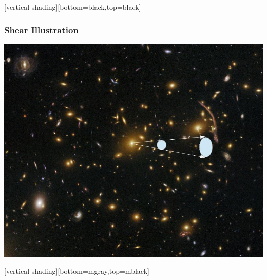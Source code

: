 \documentclass{beamer}
\begin{document}
{
    [vertical shading][bottom=black,top=black]
	
    \frame
    {
        \frametitle{Shear Illustration}
        \begin{center}
            \includegraphics[height=0.8\textheight]{shear-illustration-nowhite.jpg}
        \end{center}
    }

    [vertical shading][bottom=mgray,top=mblack]

}
\end{document}
